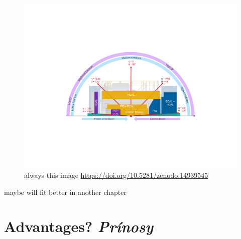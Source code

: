 \begin{figure}[H]
    \centering
    \includegraphics[width=.8\linewidth]{img/range.pdf}
    \caption{always this image \url{https://doi.org/10.5281/zenodo.14939545}}
    \label{fig:eic:range}
\end{figure}
maybe will fit better in another chapter



\section{Advantages? \textit{Prínosy}}